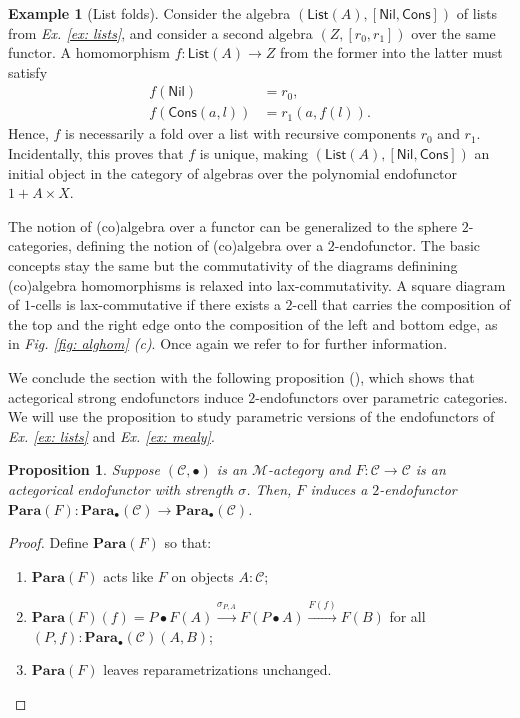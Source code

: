 \documentclass[11pt,a4paper,openright,twoside]{report}
\newcounter{mycounter}
\theoremstyle{plain}
\newtheorem{proposition}[mycounter]{Proposition}
\theoremstyle{definition}
\newtheorem{example}[mycounter]{Example}
\begin{document}
\begin{example}[List folds]
  \label{ex: listfold}
  Consider the algebra $(\mathsf{List}(A), [\mathsf{Nil}, \mathsf{Cons}])$ of lists from \textit{Ex. \ref{ex: lists}}, and consider a second algebra $(Z, [r_0,r_1])$ over the same functor. A homomorphism $f: \mathsf{List}(A) \to Z$ from the former into the latter must satisfy 
  \begin{align*}
    f(\mathsf{Nil}) &= r_0,\\
    f(\mathsf{Cons}(a,l)) &= r_1(a,f(l)). 
  \end{align*}
  Hence, $f$ is necessarily a fold over a list with recursive components $r_0$ and $r_1$. Incidentally, this proves that $f$ is unique, making $(\mathsf{List}(A), [\mathsf{Nil}, \mathsf{Cons}])$ an initial object in the category of algebras over the polynomial endofunctor $1 + A \times X$.
\end{example}

The notion of (co)algebra over a functor can be generalized to the sphere $2$-categories, defining the notion of (co)algebra over a $2$-endofunctor. The basic concepts stay the same but the commutativity of the diagrams definining (co)algebra homomorphisms is relaxed into lax-commutativity. A square diagram of $1$-cells is lax-commutative if there exists a $2$-cell that carries the composition of the top and the right edge onto the composition of the left and bottom edge, as in \textit{Fig. \ref{fig: alghom} (c)}. Once again we refer to \cite{gavranovicposition} for further information.


We conclude the section with the following proposition (\cite{gavranovicposition}), which shows that actegorical strong endofunctors induce $2$-endofunctors over parametric categories. We will use the proposition to study parametric versions of the endofunctors of \textit{Ex. \ref{ex: lists}} and \textit{Ex. \ref{ex: mealy}}.

\begin{proposition}
  \label{prop: paraend}
  Suppose $(\mathcal{C}, \bullet)$ is an $\mathcal{M}$-actegory and $F: \mathcal{C} \to \mathcal{C}$ is an actegorical endofunctor with strength $\sigma$. Then, $F$ induces a  $2$-endofunctor $\mathbf{Para}(F): \mathbf{Para}_{\bullet}(\mathcal{C}) \to \mathbf{Para}_{\bullet}(\mathcal{C})$.
\end{proposition}
\begin{proof}
  Define $\mathbf{Para}(F)$ so that: 
  \begin{enumerate}
    \item $\mathbf{Para}(F)$ acts like $F$ on objects $A: \mathcal{C}$;
    \item $\mathbf{Para}(F)(f) = P \bullet F(A) \stackrel{\sigma_{P,A}}{\longrightarrow} F(P \bullet A) \stackrel{F(f)}{\longrightarrow} F(B)$ for all $(P,f):\mathbf{Para}_{\bullet}(\mathcal{C})(A,B)$;
    \item $\mathbf{Para}(F)$ leaves reparametrizations unchanged.
  \end{enumerate}
\end{proof}
\end{document}
